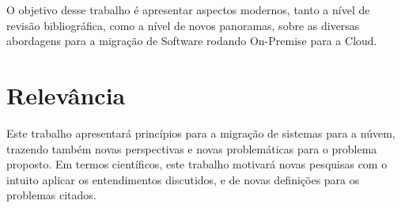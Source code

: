 O objetivo desse trabalho é apresentar aspectos modernos, tanto a nível de revisão bibliográfica, como a nível de novos panoramas, sobre as diversas abordagens para a migração de Software rodando On-Premise para a Cloud.


\section{Relevância}
    Este trabalho apresentará princípios para a migração de sistemas para a núvem, trazendo também novas perspectivas e novas problemáticas para o problema proposto.
    Em termos científicos, este trabalho motivará novas pesquisas com o intuito aplicar os entendimentos discutidos, e de novas definições para os problemas citados.

